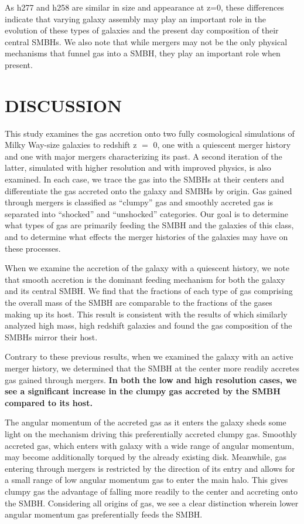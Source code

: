 \documentclass[12pt,headA,chapB]{fiskthesis}
\begin{document}
As h277 and h258 are similar in size and appearance at z=0, these differences indicate that varying galaxy assembly may play an important role in the evolution of these types of galaxies and the present day composition of their central SMBHs. We also note that while mergers may not be the only physical mechanisms that funnel gas into a SMBH, they play an important role when present.




\chapter{\normalsize DISCUSSION}
\thispagestyle{empty}
This study examines the gas accretion onto two fully cosmological simulations of Milky Way-size galaxies to redshift z $=$ 0, one with a quiescent merger history and one with major mergers characterizing its past. A second iteration of the latter, simulated with higher resolution and with improved physics, is also examined. In each case, we trace the gas into the SMBHs at their centers and differentiate the gas accreted onto the galaxy and SMBHs by origin. Gas gained through mergers is classified as ``clumpy'' gas and smoothly accreted gas is separated into ``shocked'' and ``unshocked'' categories. Our goal is to determine what types of gas are primarily feeding the SMBH and the galaxies of this class, and to determine what effects the merger histories of the galaxies may have on these processes.

When we examine the accretion of the galaxy with a quiescent history, we note that smooth accretion is the dominant feeding mechanism for both the galaxy and its central SMBH. We find that the fractions of each type of gas comprising the overall mass of the SMBH are comparable to the fractions of the gases making up its host. This result is consistent with the results of \cite{Bellovary2013} which similarly analyzed high mass, high redshift galaxies and found the gas composition of the SMBHs mirror their host.

Contrary to these previous results, when we examined the galaxy with an active merger history, we determined that the SMBH at the center more readily accretes gas gained through mergers. \textbf{In both the low and high resolution cases, we see a significant increase in the clumpy gas accreted by the SMBH compared to its host.} 

The angular momentum of the accreted gas as it enters the galaxy sheds some light on the mechanism driving this preferentially accreted clumpy gas. Smoothly accreted gas, which enters with galaxy with a wide range of angular momentum, may become additionally torqued by the already existing disk. Meanwhile, gas entering through mergers is restricted by the direction of its entry and allows for a small range of low angular momentum gas to enter the main halo. This gives clumpy gas the advantage of falling more readily to the center and accreting onto the SMBH. Considering all origins of gas, we see a clear distinction wherein lower angular momentum gas preferentially feeds the SMBH.
\end{document}
